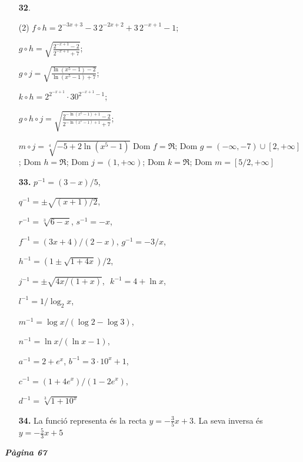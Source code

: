 \documentclass[a4paper, pdf, twoside]{book}
\begin{document}
\begin{multicols}{2}
\begin{enumerate}
 \item[\fontfamily{phv}\selectfont\color{blue}\textbf{32}. ] 
 \begin{tasks}[column-sep=1em, item-indent=1.3333em](2)
	 \task* $f\circ h=2^{-3x+3}-3\,2^{-2x+2}+3\,2^{-x+1}-1$;\par $g\circ h=\sqrt {\frac {2^{-x+1}-2}{2^{-x+1}+7}}$;\par $g\circ j=\sqrt {\frac {\ln (x^5-1)-2}{\ln (x^5-1)+7}}$;\par $k\circ h=2^{2^{-x+1}}\cdot 30^{2^{-x+1}-1}$;\par $g\circ h \circ j=\sqrt {\frac {2^{-\ln (x^5-1)+1}-2}{2^{-\ln (x^5-1)+1}+7}}$;\par $m\circ j=\sqrt [4]{-5+2\ln (x^5-1)}$
	 \task* Dom $f=\Re $; Dom $g=(-\infty ,-7)\cup [2,+\infty ]$; Dom $h=\Re $; Dom $j=(1,+\infty )$; Dom $k=\Re $; Dom $m=[5/2,+\infty ]$
\end{tasks}
 \end{enumerate}
\begin{enumerate}
\vspace{0.25cm}
\item[\fontfamily{phv}\selectfont\color{blue}\textbf{33. }]  \scalebox{0.6}{\simbolclau } 
$p^{-1}=(3-x)/5$,\par $q^{-1}=\pm \sqrt {(x+1)/2}$,\par $r^{-1}=\sqrt [3]{6-x}$, $s^{-1}=-x$,\par $f^{-1}=(3x+4)/(2-x)$, $g^{-1}=-3/x$,\par $h^{-1}=(1\pm \sqrt {1+4x})/2$,\par $j^{-1}=\pm \sqrt {4x/(1+x)}$, \,\,$k^{-1}=4+\ln x$,\par $l^{-1}=1/\log _2 {x}$,\par $m^{-1}=\log x /(\log 2 - \log 3)$,\par $n^{-1}=\ln x / (\ln x -1)$,\par $a^{-1}=2+e^x$, $b^{-1}=3\cdot 10^x +1$,\par $c^{-1}=(1+4 e^x)/(1-2 e^x)$,\par $d^{-1}=\sqrt [3]{1+10^x}$ 
\vspace{0.25cm}
\item[\fontfamily{phv}\selectfont\color{blue}\textbf{34. }] 
La funció representa és la recta $y=-\frac {3}{5}x+3$. La seva inversa és $y=-\frac {5}{3}x+5$
 \end{enumerate}
\vspace{0.3cm}


{\textbf{\em Pàgina 67}} \hrulefill
\begin{enumerate}
\vspace{0.25cm}



\end{enumerate}
\end{multicols}
\end{document}
